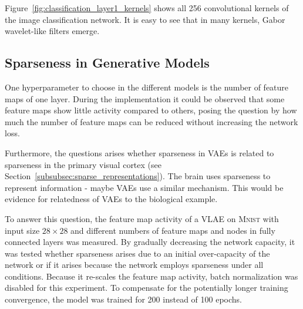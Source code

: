 Figure~\ref{fig:classification_layer1_kernels} shows all 256 convolutional kernels of the image classification network.
It is easy to see that in many kernels, Gabor wavelet-like filters emerge.

\subsection{Sparseness in Generative Models}\label{subsec:effective-network-capacity}
One hyperparameter to choose in the different models is the number of feature maps of one layer.
During the implementation it could be observed that some feature maps show little activity compared to others, posing the question by how much the number of feature maps can be reduced without increasing the network loss.

Furthermore, the questions arises whether sparseness in \acp{VAE} is related to sparseness in the primary visual cortex (see Section~\ref{subsubsec:sparse_representations}).
The brain uses sparseness to represent information - maybe \acp{VAE} use a similar mechanism.
This would be evidence for relatedness of \acp{VAE} to the biological example.

To answer this question, the feature map activity of a \ac{VLAE} on \textsc{Mnist} with input size $28\times 28$ and different numbers of feature maps and nodes in fully connected layers was measured.
By gradually decreasing the network capacity, it was tested whether sparseness arises due to an initial over-capacity of the network or if it arises because the network employs sparseness under all conditions.
Because it re-scales the feature map activity, batch normalization was disabled for this experiment.
To compensate for the potentially longer training convergence, the model was trained for 200 instead of 100 epochs.

